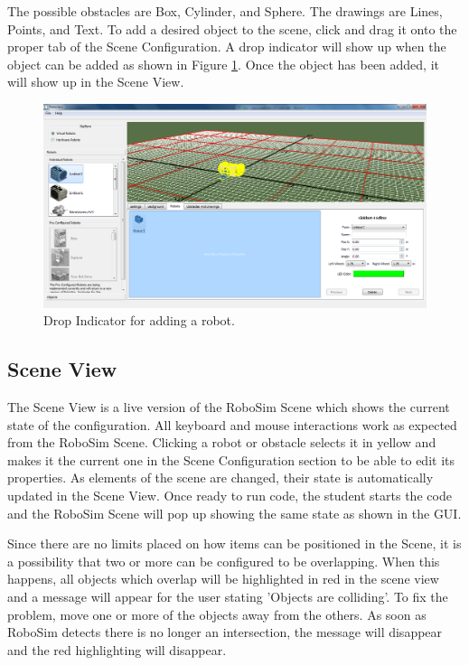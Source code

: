 \documentclass{article}
\begin{document}
The possible obstacles are Box, Cylinder, and Sphere.  The drawings are Lines,
Points, and Text.  To add a desired object to the scene, click and drag it onto
the proper tab of the Scene Configuration.  A drop indicator will show up when
the object can be added as shown in Figure \ref{fig:drop}.  Once the object has
been added, it will show up in the Scene View.
\begin{figure}[H]
	\begin{center}
		\includegraphics[width=5in]{pictures/gui_drop}
	\end{center}
	\caption{Drop Indicator for adding a robot.}
	\label{fig:drop}
\end{figure}

\subsection{Scene View}
The Scene View is a live version of the RoboSim Scene which shows the current
state of the configuration.  All keyboard and mouse interactions work as
expected from the RoboSim Scene.  Clicking a robot or obstacle selects it in
yellow and makes it the current one in the Scene Configuration section to be
able to edit its properties.  As elements of the scene are changed, their state
is automatically updated in the Scene View.  Once ready to run code, the student
starts the code and the RoboSim Scene will pop up showing the same state as
shown in the GUI.

Since there are no limits placed on how items can be positioned in the Scene,
it is a possibility that two or more can be configured to be overlapping.  When
this happens, all objects which overlap will be highlighted in red in the scene
view and a message will appear for the user stating 'Objects are colliding'.
To fix the problem, move one or more of the objects away from the others.  As
soon as RoboSim detects there is no longer an intersection, the message will
disappear and the red highlighting will disappear.
\end{document}
